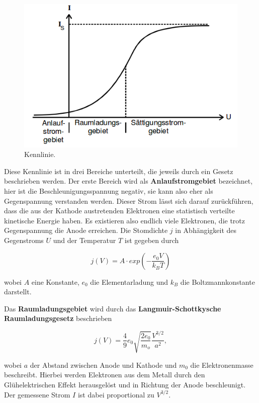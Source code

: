 \begin{figure}
  \centering
  \includegraphics[scale = 0.5]{Kennlinie.png}
  \caption{Kennlinie. \cite{Q1}}
  \label{abb:2}
\end{figure}

Diese Kennlinie ist in drei Bereiche unterteilt, die jeweils durch ein Gesetz beschrieben werden.
Der erste Bereich wird als \textbf{Anlaufstromgebiet} bezeichnet, hier ist die Beschleunigungsspannung negativ, sie kann also eher als Gegenspannung
verstanden werden. Dieser Strom lässt sich darauf zurückführen, dass die aus der Kathode austretenden Elektronen eine statistisch verteilte
kinetische Energie haben. Es existieren also endlich viele Elektronen, die trotz Gegenspannung die Anode erreichen. Die Stomdichte $j$ in
Abhängigkeit des Gegenstroms $U$ und der Temperatur $T$ ist gegeben durch

\begin{equation}
  j(V) = A \cdot exp \left(- \frac{e_0 V}{k_B T} \right)
\end{equation}

wobei $A$ eine Konstante, $e_0$ die Elementarladung und $k_B$ die Boltzmannkonstante darstellt.

Das \textbf{Raumladungsgebiet} wird durch das \textbf{Langmuir-Schottkysche Raumladungsgesetz} beschrieben

\begin{equation}
  j(V) = \frac{4}{9} e_0 \sqrt{\frac{2e_0}{m_o}} \frac{V^{3/2}}{a^2},
\end{equation}

wobei $a$ der Abstand zwischen Anode und Kathode und $m_0$ die Elektronenmasse beschreibt. Hierbei werden Elektronen aus dem Metall durch den Glühelektrischen Effekt herausgelöst und in Richtung der Anode beschleunigt.
Der gemessene Strom $I$ ist dabei proportional zu $V^{3/2}$.

